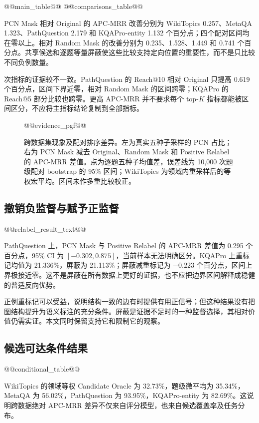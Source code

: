 \documentclass[UTF8,a4paper,10pt,fontset=fandol]{ctexart}
\begin{document}
@@main_table@@
@@comparisons_table@@

PCN Mask 相对 Original 的 APC-MRR 改善分别为 WikiTopics 0.257、MetaQA 1.323、PathQuestion 2.179 和 KQAPro-entity 1.132 个百分点；四个配对区间均在零以上。相对 Random Mask 的改善分别为 0.235、1.528、1.449 和 0.741 个百分点。共享候选和逐题等量屏蔽使这些比较支持定向位置的重要性，而不是只比较不同负例数量。

次指标的证据较不一致。PathQuestion 的 Reach@10 相对 Original 只提高 0.619 个百分点，区间下界近零，相对 Random Mask 的区间跨零；KQAPro 的 Reach@5 部分比较也跨零。更高 APC-MRR 并不要求每个 top-$K$ 指标都能被区间区分，不应将主指标结论复制到全部指标。

\begin{figure}[tbp]\centering
\begin{lrbox}{\pcnfigurebox}
@@evidence_pgf@@
\end{lrbox}\resizebox{\linewidth}{!}{\usebox{\pcnfigurebox}}
\caption{跨数据集现象及配对排序差异。左为真实五种子采样的 PCN 占比；右为 PCN Mask 减去 Original、Random Mask 和 Positive Relabel 的 APC-MRR 差值。点为逐题五种子均值差，误差线为 10,000 次题级配对 bootstrap 的 95\% 区间；WikiTopics 为领域内重采样后的等权宏平均。区间未作多重比较校正。}\label{fig:evidence}
\end{figure}

\subsection{撤销负监督与赋予正监督}
@@relabel_result_text@@

PathQuestion 上，PCN Mask 与 Positive Relabel 的 APC-MRR 差值为 0.295 个百分点，95\% CI 为 $[-0.302,0.875]$，当前样本无法明确区分。KQAPro 上重标记均值为 21.336\%，屏蔽为 21.113\%；屏蔽减重标记为 $-0.223$ 个百分点，区间上界极接近零。这不是屏蔽在所有数据上更好的证据，也不应把边界区间解释成稳健的普适反向优势。

正例重标记可以受益，说明结构一致的边有时提供有用正信号；但这种结果没有把图结构提升为语义标注的充分条件。屏蔽是证据不足时的一种监督选择，其相对价值仍需实证。本文同时保留支持它和限制它的观察。

\subsection{候选可达条件结果}
@@conditional_table@@

WikiTopics 的领域等权 Candidate Oracle 为 32.73\%，题级微平均为 35.34\%，MetaQA 为 56.02\%，PathQuestion 为 93.95\%，KQAPro-entity 为 82.69\%。这说明跨数据绝对 APC-MRR 差异不仅来自评分模型，也来自候选覆盖率及任务分布。
\end{document}
